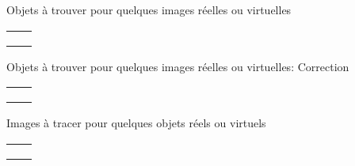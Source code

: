 \documentclass{article}
\newcommand{\titre}[1]{\hfil{\Large #1}}
\begin{document}
\titre{Objets \`a trouver pour quelques images r\'eelles ou virtuelles}
\begin{tabular}{|c|c|}
\hline
&\\ \hline
&\\ \hline
&\\ \hline
&\\ \hline
\end{tabular}


\newpage


\titre{Objets \`a trouver pour quelques images r\'eelles ou virtuelles: Correction}
\begin{tabular}{|c|c|}
\hline
&\\ \hline
&\\ \hline
&\\ \hline
&\\ \hline
\end{tabular}


\newpage
\setcounter{page}{1}
\titre{Images \`a tracer pour quelques objets r\'eels ou virtuels}
\begin{tabular}{|c|c|}
\hline
&\\ \hline
&\\ \hline
&\\ \hline
&\\ \hline
\end{tabular}


\newpage
\end{document}

